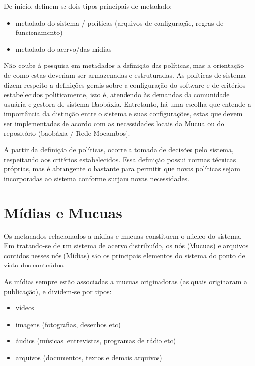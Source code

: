 De início, definem-se dois tipos principais de metadado:
\begin{itemize}
\item metadado do sistema / políticas (arquivos de configuração,
  regras de funcionamento)
\item metadado do acervo/das mídias
\end{itemize}

Não coube à pesquisa em metadados a definição das políticas, mas a
orientação de como estas deveriam ser armazenadas e estruturadas. As
políticas de sistema dizem respeito a definições gerais sobre a
configuração do software e de critérios estabelecidos politicamente,
isto é, atendendo às demandas da comunidade usuária e gestora do
sistema Baobáxia. Entretanto, há uma escolha que entende a importância
da distinção entre o sistema e suas configurações, estas que devem ser
implementadas de acordo com as necessidades locais da Mucua ou do
repositório (baobáxia / Rede Mocambos).

A partir da definição de políticas, ocorre a tomada de decisões pelo
sistema, respeitando aos critérios estabelecidos. Essa definição
possui normas técnicas próprias, mas é abrangente o bastante para
permitir que novas políticas sejam incorporadas ao sistema conforme
surjam novas necessidades.

\section{Mídias e Mucuas}
Os metadados relacionados a mídias e mucuas constituem o núcleo do
sistema. Em tratando-se de um sistema de acervo distribuído, os nós
(Mucuas) e arquivos contidos nesses nós (Mídias) são os principais
elementos do sistema do ponto de vista dos conteúdos.

As mídias sempre estão associadas a mucuas originadoras (as quais originaram a publicação), e dividem-se por tipos:
\begin{itemize}
\item vídeos
\item imagens (fotografias, desenhos etc)
\item áudios (músicas, entrevistas, programas de rádio etc)
\item arquivos (documentos, textos e demais arquivos)
\end{itemize}

